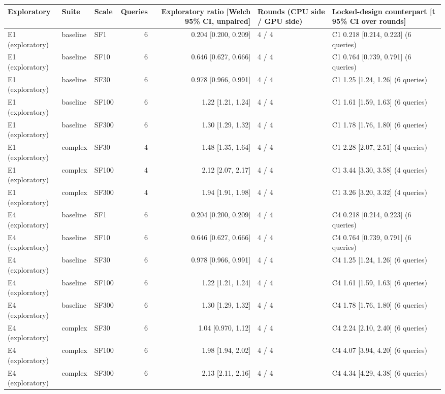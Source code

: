\begin{longtable}{lllrrll}
\toprule
Exploratory & Suite & Scale & Queries & Exploratory ratio [Welch 95\% CI, unpaired] & Rounds (CPU side / GPU side) & Locked-design counterpart [t 95\% CI over rounds] \\
\midrule
\endhead
\bottomrule
\endfoot
E1 (exploratory) & baseline & SF1 & 6 & 0.204 [0.200, 0.209] & 4 / 4 & C1 0.218 [0.214, 0.223] (6 queries) \\
E1 (exploratory) & baseline & SF10 & 6 & 0.646 [0.627, 0.666] & 4 / 4 & C1 0.764 [0.739, 0.791] (6 queries) \\
E1 (exploratory) & baseline & SF30 & 6 & 0.978 [0.966, 0.991] & 4 / 4 & C1 1.25 [1.24, 1.26] (6 queries) \\
E1 (exploratory) & baseline & SF100 & 6 & 1.22 [1.21, 1.24] & 4 / 4 & C1 1.61 [1.59, 1.63] (6 queries) \\
E1 (exploratory) & baseline & SF300 & 6 & 1.30 [1.29, 1.32] & 4 / 4 & C1 1.78 [1.76, 1.80] (6 queries) \\
E1 (exploratory) & complex & SF30 & 4 & 1.48 [1.35, 1.64] & 4 / 4 & C1 2.28 [2.07, 2.51] (4 queries) \\
E1 (exploratory) & complex & SF100 & 4 & 2.12 [2.07, 2.17] & 4 / 4 & C1 3.44 [3.30, 3.58] (4 queries) \\
E1 (exploratory) & complex & SF300 & 4 & 1.94 [1.91, 1.98] & 4 / 4 & C1 3.26 [3.20, 3.32] (4 queries) \\
E4 (exploratory) & baseline & SF1 & 6 & 0.204 [0.200, 0.209] & 4 / 4 & C4 0.218 [0.214, 0.223] (6 queries) \\
E4 (exploratory) & baseline & SF10 & 6 & 0.646 [0.627, 0.666] & 4 / 4 & C4 0.764 [0.739, 0.791] (6 queries) \\
E4 (exploratory) & baseline & SF30 & 6 & 0.978 [0.966, 0.991] & 4 / 4 & C4 1.25 [1.24, 1.26] (6 queries) \\
E4 (exploratory) & baseline & SF100 & 6 & 1.22 [1.21, 1.24] & 4 / 4 & C4 1.61 [1.59, 1.63] (6 queries) \\
E4 (exploratory) & baseline & SF300 & 6 & 1.30 [1.29, 1.32] & 4 / 4 & C4 1.78 [1.76, 1.80] (6 queries) \\
E4 (exploratory) & complex & SF30 & 6 & 1.04 [0.970, 1.12] & 4 / 4 & C4 2.24 [2.10, 2.40] (6 queries) \\
E4 (exploratory) & complex & SF100 & 6 & 1.98 [1.94, 2.02] & 4 / 4 & C4 4.07 [3.94, 4.20] (6 queries) \\
E4 (exploratory) & complex & SF300 & 6 & 2.13 [2.11, 2.16] & 4 / 4 & C4 4.34 [4.29, 4.38] (6 queries) \\
\end{longtable}
